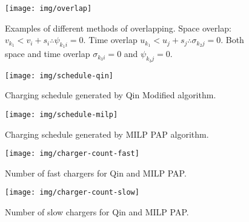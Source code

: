 \documentclass[utf8]{FrontiersinHarvard}
\begin{document}
\begin{figure}[htpb]
\centering
    \texttt{[image: img/overlap]}
    \caption{Examples of different methods of overlapping. Space overlap: $v_{k_1} < v_{i} + s_i \therefore \psi_{k_{1}i} = 0$.
             Time overlap $u_{k_1} < u_{j} + s_j \therefore \sigma_{k_{2}j} = 0$. Both space and time overlap $\sigma_{k_{3}i} = 0$ and
             $\psi_{k_{3}j} = 0$.}
    \label{fig:multipleassign}
\end{figure}

\begin{subfigures}
    \begin{figure}[htpb]
    \centering
        \texttt{[image: img/schedule-qin]}
        \caption{Charging schedule generated by Qin Modified algorithm.}
        \label{subfig:qin-schedule}
    \end{figure}

    \hfill

    \begin{figure}[htpb]
    \centering
        \texttt{[image: img/schedule-milp]}
        \caption{Charging schedule generated by MILP PAP algorithm.}
        \label{subfig:milp-schedule}
    \end{figure}
\end{subfigures}

\begin{subfigures}
    \begin{figure}[htpb]
    \centering
        \texttt{[image: img/charger-count-fast]}
        \caption{Number of fast chargers for Qin and MILP PAP.}
        \label{subfig:fast-charger-usage}
    \end{figure}

    \hfill

    \begin{figure}[!ht]
    \centering
        \texttt{[image: img/charger-count-slow]}
        \caption{Number of slow chargers for Qin and MILP PAP.}
        \label{subfig:slow-charger-usage}
    \end{figure}
\end{subfigures}
\end{document}
